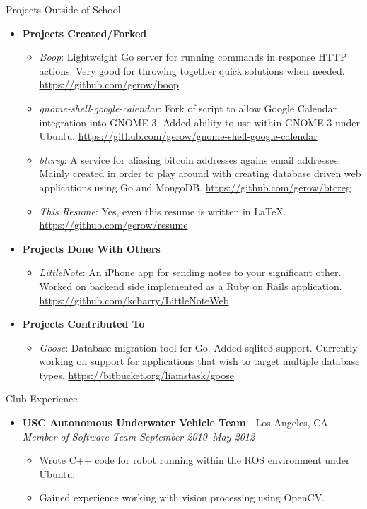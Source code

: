 \documentclass[10pt,oneside]{article}
\newenvironment{ressection}[1]{
	\vspace{4pt}
	{\fontfamily{phv}\selectfont\Large#1}
	\begin{itemize}
	\vspace{3pt}
}{
	\end{itemize}
}
\newcommand{\ressubitem}[1]{
	\vspace{-1pt}
	\item \begin{flushleft} #1 \end{flushleft}
}
\newcommand{\resbigitem}[3]{
	\vspace{-5pt}
	\item
	\textbf{#1}---#2 \\
	\textit{#3}
}
\newcommand{\resveryshortbigitem}[1]{
	\vspace{-5pt}
	\item
	\textbf{#1}
}
\newenvironment{ressubsec}[3]{
	\resbigitem{#1}{#2}{#3}
	\vspace{-2pt}
	\begin{itemize}
}{
	\end{itemize}
}
\newenvironment{resveryshortsubsec}[1]{
	\resveryshortbigitem{#1}
	\vspace{-2pt}
	\begin{itemize}
}{
    \end{itemize}
}
\begin{document}
\begin{ressection}{Projects Outside of School}
    \begin{resveryshortsubsec}{Projects Created/Forked}
        \ressubitem{\emph{Boop}: Lightweight Go server for running commands in response HTTP actions.  Very good for throwing together quick solutions when needed. \url{https://github.com/gerow/boop}}
        \ressubitem{\emph{gnome-shell-google-calendar}: Fork of script to allow Google Calendar integration into GNOME 3. Added ability to use within GNOME 3 under Ubuntu. \url{https://github.com/gerow/gnome-shell-google-calendar}}
        \ressubitem{\emph{btcreg}: A service for aliasing bitcoin addresses agains email addresses. Mainly created in order to play around with creating database driven web applications using Go and MongoDB.  \url{https://github.com/gerow/btcreg}}
        \ressubitem{\emph{This Resume}: Yes, even this resume is written in \LaTeX. \url{https://github.com/gerow/resume}}
    \end{resveryshortsubsec}
    \begin{resveryshortsubsec}{Projects Done With Others}
        \ressubitem{\emph{LittleNote}: An iPhone app for sending notes to your significant other.  Worked on backend side implemented as a Ruby on Rails application. \url{https://github.com/kcbarry/LittleNoteWeb}}
    \end{resveryshortsubsec}
    \begin{resveryshortsubsec}{Projects Contributed To}
        \ressubitem{\emph{Goose}: Database migration tool for Go. Added sqlite3 support. Currently working on support for applications that wish to target multiple database types. \url{https://bitbucket.org/liamstask/goose}}
    \end{resveryshortsubsec}
\end{ressection}

\begin{ressection}{Club Experience}
	\begin{ressubsec}{USC Autonomous Underwater Vehicle Team}{Los Angeles, CA}{Member of Software Team September 2010--May 2012}
		\ressubitem{Wrote C++ code for robot running within the ROS environment under Ubuntu.}
		\ressubitem{Gained experience working with vision processing using OpenCV.}
	\end{ressubsec}
\end{ressection}
\end{document}
